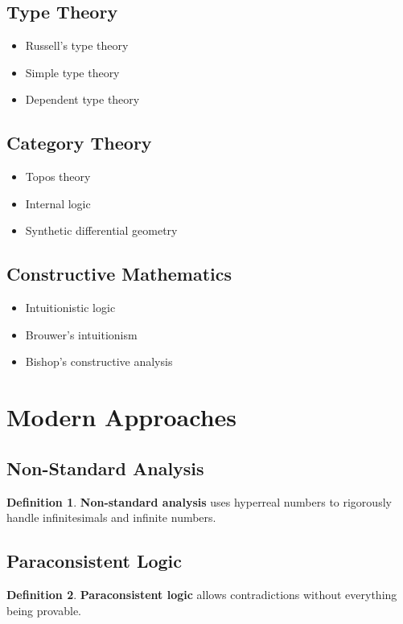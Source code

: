 \documentclass[11pt]{article}
\theoremstyle{definition}
\newtheorem{definition}{Definition}[section]
\begin{document}
\subsection{Type Theory}
\begin{itemize}
    \item Russell's type theory
    \item Simple type theory
    \item Dependent type theory
\end{itemize}

\subsection{Category Theory}
\begin{itemize}
    \item Topos theory
    \item Internal logic
    \item Synthetic differential geometry
\end{itemize}

\subsection{Constructive Mathematics}
\begin{itemize}
    \item Intuitionistic logic
    \item Brouwer's intuitionism
    \item Bishop's constructive analysis
\end{itemize}

\section{Modern Approaches}

\subsection{Non-Standard Analysis}
\begin{definition}
\textbf{Non-standard analysis} uses hyperreal numbers to rigorously handle infinitesimals and infinite numbers.
\end{definition}

\subsection{Paraconsistent Logic}
\begin{definition}
\textbf{Paraconsistent logic} allows contradictions without everything being provable.
\end{definition}
\end{document}
